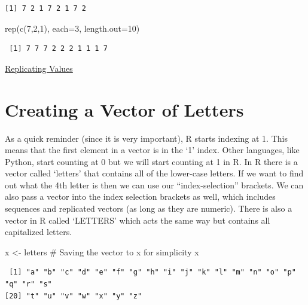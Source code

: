 \documentclass[
  letterpaper,
  DIV=11,
  numbers=noendperiod]{scrreprt}
\newenvironment{Shaded}{\begin{snugshade}}{\end{snugshade}}
\newcommand{\AttributeTok}[1]{\textcolor[rgb]{0.40,0.45,0.13}{#1}}
\newcommand{\CommentTok}[1]{\textcolor[rgb]{0.37,0.37,0.37}{#1}}
\newcommand{\DecValTok}[1]{\textcolor[rgb]{0.68,0.00,0.00}{#1}}
\newcommand{\FunctionTok}[1]{\textcolor[rgb]{0.28,0.35,0.67}{#1}}
\newcommand{\NormalTok}[1]{\textcolor[rgb]{0.00,0.23,0.31}{#1}}
\newcommand{\OtherTok}[1]{\textcolor[rgb]{0.00,0.23,0.31}{#1}}
\begin{document}
\begin{verbatim}
[1] 7 2 1 7 2 1 7 2
\end{verbatim}

\begin{Shaded}
\begin{Highlighting}[]
\FunctionTok{rep}\NormalTok{(}\FunctionTok{c}\NormalTok{(}\DecValTok{7}\NormalTok{,}\DecValTok{2}\NormalTok{,}\DecValTok{1}\NormalTok{), }\AttributeTok{each=}\DecValTok{3}\NormalTok{, }\AttributeTok{length.out=}\DecValTok{10}\NormalTok{)}
\end{Highlighting}
\end{Shaded}

\begin{verbatim}
 [1] 7 7 7 2 2 2 1 1 1 7
\end{verbatim}

\begin{watch}{}{}
    \href{https://youtu.be/OGBhjbDChgQ}{Replicating Values}
\end{watch}

\section{Creating a Vector of
Letters}\label{creating-a-vector-of-letters}

As a quick reminder (since it is very important), R starts indexing at
1. This means that the first element in a vector is in the `1' index.
Other languages, like Python, start counting at 0 but we will start
counting at 1 in R. In R there is a vector called `letters' that
contains all of the lower-case letters. If we want to find out what the
4th letter is then we can use our ``index-selection'' brackets. We can
also pass a vector into the index selection brackets as well, which
includes sequences and replicated vectors (as long as they are numeric).
There is also a vector in R called `LETTERS' which acts the same way but
contains all capitalized letters.

\begin{Shaded}
\begin{Highlighting}[]
\NormalTok{x }\OtherTok{\textless{}{-}}\NormalTok{ letters }\CommentTok{\# Saving the vector to \textquotesingle{}x\textquotesingle{} for simplicity}
\NormalTok{x}
\end{Highlighting}
\end{Shaded}

\begin{verbatim}
 [1] "a" "b" "c" "d" "e" "f" "g" "h" "i" "j" "k" "l" "m" "n" "o" "p" "q" "r" "s"
[20] "t" "u" "v" "w" "x" "y" "z"
\end{verbatim}
\end{document}
